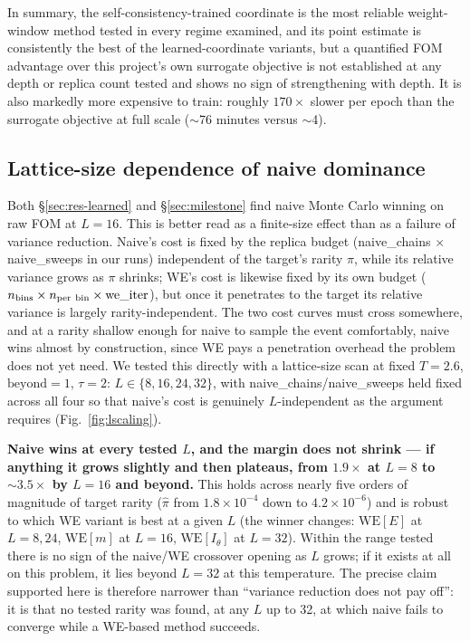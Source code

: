 \documentclass[a4paper,fleqn]{cas-sc}
\begin{document}
	In summary, the self-consistency-trained coordinate is the most reliable weight-window
	method tested in every regime examined, and its point estimate is consistently the best of
	the learned-coordinate variants, but a quantified FOM advantage over this project's own
	surrogate objective is not established at any depth or replica count tested and shows no
	sign of strengthening with depth. It is also markedly more expensive to train: roughly
	$170\times$ slower per epoch than the surrogate objective at full scale ($\sim$76 minutes
	versus $\sim$4).
	
	\subsection{Lattice-size dependence of naive dominance}\label{sec:lscaling}
	Both \S\ref{sec:res-learned} and \S\ref{sec:milestone} find naive Monte Carlo winning on raw
	FOM at $L=16$. This is better read as a finite-size effect than as a failure of variance
	reduction. Naive's cost is fixed by the replica budget (naive\_chains $\times$ naive\_sweeps
	in our runs) independent of the target's rarity $\pi$, while its relative variance grows as
	$\pi$ shrinks; WE's cost is likewise fixed by its own budget
	($n_{\rm bins}\times n_{\rm per\ bin}\times\mathrm{we\_iter}$), but once it penetrates to
	the target its relative variance is largely rarity-independent. The two cost curves must
	cross somewhere, and at a rarity shallow enough for naive to sample the event comfortably,
	naive wins almost by construction, since WE pays a penetration overhead the problem does not
	yet need. We tested this directly with a lattice-size scan at fixed $T=2.6$,
	$\mathrm{beyond}=1$, $\tau=2$: $L\in\{8,16,24,32\}$, with naive\_chains/naive\_sweeps held
	fixed across all four so that naive's cost is genuinely $L$-independent as the argument
	requires (Fig.~\ref{fig:lscaling}).
	
	\textbf{Naive wins at every tested $L$, and the margin does not shrink --- if anything it
		grows slightly and then plateaus, from $1.9\times$ at $L=8$ to $\sim\!3.5\times$ by
		$L=16$ and beyond.} This holds across nearly five orders of magnitude of target rarity
	($\hat\pi$ from $1.8\times10^{-4}$ down to $4.2\times10^{-6}$) and is robust to which WE
	variant is best at a given $L$ (the winner changes: $\mathrm{WE}[E]$ at $L=8,24$,
	$\mathrm{WE}[m]$ at $L=16$, $\mathrm{WE}[I_\theta]$ at $L=32$). Within the range tested
	there is no sign of the naive/WE crossover opening as $L$ grows; if it exists at all on this
	problem, it lies beyond $L=32$ at this temperature. The precise claim supported here is
	therefore narrower than ``variance reduction does not pay off'': it is that no tested rarity
	was found, at any $L$ up to 32, at which naive fails to converge while a WE-based method
	succeeds.
	
\end{document}
